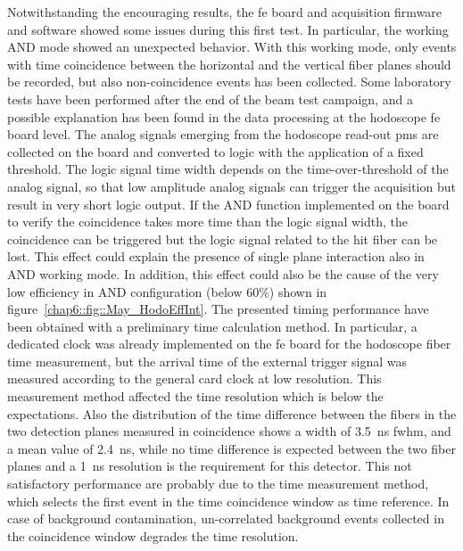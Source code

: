 Notwithstanding the encouraging results, the \gls{fe} board and acquisition firmware and software showed some issues during this first test. In particular, the working AND mode showed an unexpected behavior. With this working mode, only events with time coincidence between the horizontal and the vertical fiber planes should be recorded, but also non-coincidence events has been collected. Some laboratory tests have been performed after the end of the beam test campaign, and a possible explanation has been found in the data processing at the hodoscope \gls{fe} board level. The analog signals emerging from the hodoscope read-out \glspl{pm} are collected on the board and converted to logic with the application of a fixed threshold. The logic signal time width depends on the time-over-threshold of the analog signal, so that low amplitude analog signals can trigger the acquisition but result in very short logic output. If the AND function implemented on the board to verify the coincidence takes more time than the logic signal width, the coincidence can be triggered but the logic signal related to the hit fiber can be lost. 
This effect could explain the presence of single plane interaction also in AND working mode. In addition, this effect could also be the cause of the very low efficiency in AND configuration (below 60\%) shown in figure~\ref{chap6::fig::May_HodoEffInt}.
The presented timing performance have been obtained with a preliminary time calculation method. In particular, a dedicated clock was already implemented on the \gls{fe} board for the hodoscope fiber time measurement, but the arrival time of the external trigger signal was measured according to the general card clock at low resolution. This measurement method affected the time resolution which is below the expectations. Also the distribution of the time difference between the fibers in the two detection planes measured in coincidence shows a width of 3.5~ns \gls{fwhm}, and a mean value of 2.4~ns, while no time difference is expected between the two fiber planes and a 1~ns resolution is the requirement for this detector. This not satisfactory performance are probably due to the time measurement method, which selects the first event in the time coincidence window as time reference. In case of background contamination, un-correlated background events collected in the coincidence window degrades the time resolution. 

